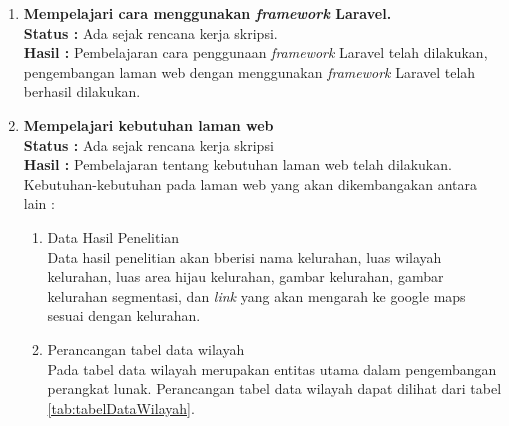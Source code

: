 \documentclass[a4paper,twoside]{article}
\begin{document}
\begin{enumerate}
		
		\item \textbf{Mempelajari cara menggunakan \textit{framework} Laravel.}\\
		{\bf Status :} Ada sejak rencana kerja skripsi.\\
		{\bf Hasil :} Pembelajaran cara penggunaan \textit{framework } Laravel telah dilakukan, pengembangan laman web dengan menggunakan \textit{framework} Laravel telah berhasil dilakukan.

		\item \textbf{ Mempelajari kebutuhan laman web}\\
		{\bf Status :} Ada sejak rencana kerja skripsi \\
		{\bf Hasil :} Pembelajaran tentang kebutuhan laman web telah dilakukan. Kebutuhan-kebutuhan pada laman web yang akan dikembangakan antara lain :
		\begin{enumerate}
			\item Data Hasil Penelitian \\
			Data hasil penelitian akan bberisi nama kelurahan, luas wilayah  kelurahan, luas area hijau kelurahan, gambar kelurahan, gambar kelurahan segmentasi, dan \textit{link} yang akan mengarah ke google maps sesuai dengan kelurahan.
			\item Perancangan tabel data wilayah \\
			Pada tabel data wilayah merupakan entitas utama dalam pengembangan perangkat lunak. Perancangan tabel data wilayah dapat dilihat dari tabel \ref{tab:tabelDataWilayah}.
			\begin{table}[H]
				\centering
				\caption{Rancangan Tabel Data Willayah}
				\label{tab:tabelDataWilayah}
\end{table}
\end{enumerate}
\end{enumerate}
\end{document}
